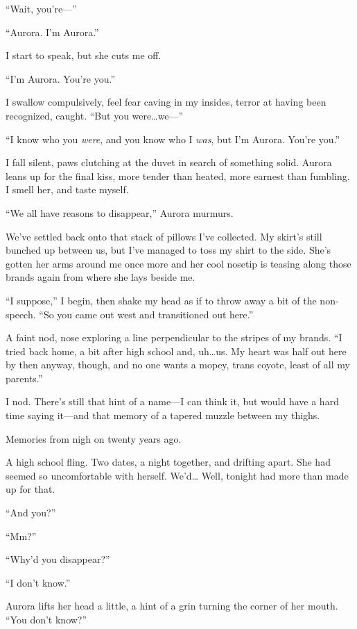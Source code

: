 ``Wait, you're---''

``Aurora. I'm Aurora.''

I start to speak, but she cuts me off.

``I'm Aurora. You're you.''

I swallow compulsively, feel fear caving in my insides, terror at having been recognized, caught. ``But you were\ldots{}we---''

``I know who you \emph{were}, and you know who I \emph{was}, but I'm Aurora. You're you.''

I fall silent, paws clutching at the duvet in search of something solid. Aurora leans up for the final kiss, more tender than heated, more earnest than fumbling. I smell her, and taste myself.

\secdiv{}

\noindent ``We all have reasons to disappear,'' Aurora murmurs.

We've settled back onto that stack of pillows I've collected. My skirt's still bunched up between us, but I've managed to toss my shirt to the side. She's gotten her arms around me once more and her cool nosetip is teasing along those brands again from where she lays beside me.

``I suppose,'' I begin, then shake my head as if to throw away a bit of the non-speech. ``So you came out west and transitioned out here.''

A faint nod, nose exploring a line perpendicular to the stripes of my brands. ``I tried back home, a bit after high school and, uh\ldots{}us. My heart was half out here by then anyway, though, and no one wants a mopey, trans coyote, least of all my parents.''

I nod. There's still that hint of a name---I can think it, but would have a hard time saying it---and that memory of a tapered muzzle between my thighs.

Memories from nigh on twenty years ago.

A high school fling. Two dates, a night together, and drifting apart. She had seemed so uncomfortable with herself. We'd\ldots{} Well, tonight had more than made up for that.

``And you?''

``Mm?''

``Why'd you disappear?''

``I don't know.''

Aurora lifts her head a little, a hint of a grin turning the corner of her mouth. ``You don't know?''

